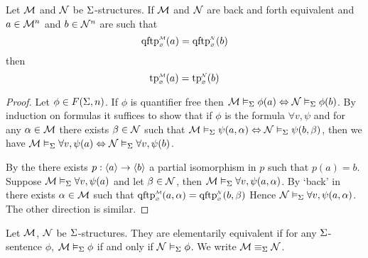 \begin{lem}
    Let $\mathcal{M}$ and $\mathcal{N}$ be $\Sigma$-structures.
    If $\mathcal{M}$ and $\mathcal{N}$ are back and forth equivalent and
    $a \in \mathcal{M}^n$ and $b \in \mathcal{N}^n$ are such that
    \[\subintp{\nothing}{\MM}{\qftp}(a) = 
    \subintp{\nothing}{\NN}{\qftp}(b)\]
    then \[\subintp{\nothing}{\MM}{\tp}(a) = 
    \subintp{\nothing}{\NN}{\tp}(b)\]
\end{lem}
\begin{proof}
    Let $\phi \in F(\Sigma,n)$.
    If $\phi$ is quantifier free then 
    $\mathcal{M} \vDash_{\Sigma} \phi(a) \Leftrightarrow \mathcal{N} \vDash_{\Sigma} \phi(b)$.
    By induction on formulas it suffices to show that if 
    $\phi$ is the formula $\forall v, \psi$ and 
    for any $\alpha \in \mathcal{M}$ there exists $\beta \in \mathcal{N}$ such that 
    $\mathcal{M} \vDash_{\Sigma} \psi(a,\alpha) \Leftrightarrow \mathcal{N} \vDash_{\Sigma} \psi(b,\beta)$, 
    then we have 
    $\mathcal{M} \vDash_{\Sigma} \forall v, \psi(a) \Leftrightarrow \mathcal{N} \vDash_{\Sigma} \forall v, \psi(b)$.

    By the 
    there exists $p : \langle a\rangle \to \langle b\rangle$ 
    a partial isomorphism in $p$ such that $p(a) = b$.
    Suppose $\mathcal{M} \vDash_{\Sigma} \forall v, \psi(a)$ and let $\beta \in \mathcal{N}$, 
    then $\mathcal{M} \vDash_{\Sigma} \forall v, \psi(a,\alpha)$.
    By `back' in 
    there exists $\alpha \in \mathcal{M}$ such that 
        $\subintp{\nothing}{\MM}{\qftp}(a,\al) = 
        \subintp{\nothing}{\NN}{\qftp}(b,\be)$
    Hence $\mathcal{N} \vDash_{\Sigma} \forall v, \psi(a,\alpha)$.
    The other direction is similar.
\end{proof}

\begin{dfn}
    Let $\mathcal{M}$, $\mathcal{N}$ be $\Sigma$-structures.
    They are elementarily equivalent if for any $\Sigma$-sentence $\phi$,
    $\mathcal{M} \vDash_{\Sigma} \phi$ if and only if $\mathcal{N} \vDash_{\Sigma} \phi$.
    We write $\mathcal{M} \equiv_\Sigma \mathcal{N}$.
\end{dfn}

